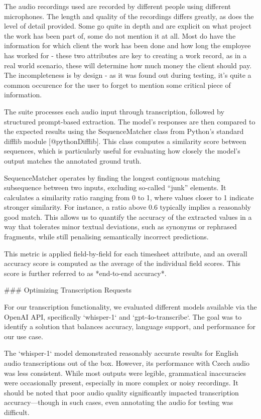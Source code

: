 \documentclass[
  digital,     %
  oneside,     %
  nosansbold,  %
  nocolorbold, %
  lof,         %
  lot,         %
]{fithesis4}
\begin{document}
\begin{markdown}
The audio recordings used are recorded by different people using different microphones. The length and quality of the recordings differs greatly, as does the level of detail provided. Some go quite in depth and are explicit on what project the work has been part of, some do not mention it at all. Most do have the information for which client the work has been done and how long the employee has worked for - these two attributes are key to creating a work record, as in a real world scenario, these will determine how much money the client should pay. The incompleteness is by design - as it was found out during testing, it's quite a common occurence for the user to forget to mention some critical piece of information.

The suite processes each audio input through transcription, followed by structured prompt-based extraction. The model's responses are then compared to the expected results using the SequenceMatcher class from Python’s standard difflib module [@pythonDifflib]. This class computes a similarity score between sequences, which is particularly useful for evaluating how closely the model's output matches the annotated ground truth.

SequenceMatcher operates by finding the longest contiguous matching subsequence between two inputs, excluding so-called “junk” elements. It calculates a similarity ratio ranging from 0 to 1, where values closer to 1 indicate stronger similarity. For instance, a ratio above 0.6 typically implies a reasonably good match. This allows us to quantify the accuracy of the extracted values in a way that tolerates minor textual deviations, such as synonyms or rephrased fragments, while still penalising semantically incorrect predictions.

This metric is applied field-by-field for each timesheet attribute, and an overall accuracy score is computed as the average of the individual field scores. This score is further referred to as *end-to-end accuracy*.

### Optimizing Transcription Requests

For our transcription functionality, we evaluated different models available via the OpenAI API, specifically `whisper-1` and `gpt-4o-transcribe`. The goal was to identify a solution that balances accuracy, language support, and performance for our use case.

The `whisper-1` model demonstrated reasonably accurate results for English audio transcriptions out of the box. However, its performance with Czech audio was less consistent. While most outputs were legible, grammatical inaccuracies were occasionally present, especially in more complex or noisy recordings. It should be noted that poor audio quality significantly impacted transcription accuracy—though in such cases, even annotating the audio for testing was difficult.


\end{markdown}
\end{document}
